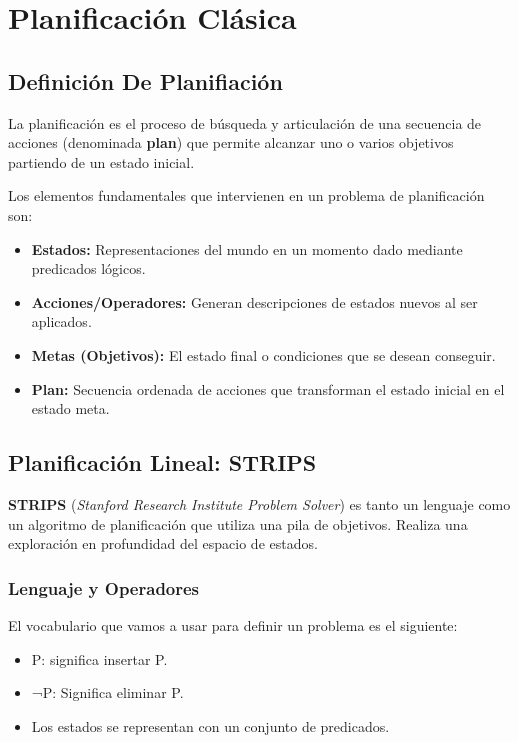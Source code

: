 \chapter{Planificación Clásica}

\section{Definición De Planifiación}
La planificación es el proceso de búsqueda y articulación de una secuencia de acciones (denominada \textbf{plan}) que permite alcanzar uno o varios objetivos partiendo de un estado inicial. 

Los elementos fundamentales que intervienen en un problema de planificación son:
\begin{itemize}
    \item \textbf{Estados:} Representaciones del mundo en un momento dado mediante predicados lógicos.
    \item \textbf{Acciones/Operadores:} Generan descripciones de estados nuevos al ser aplicados.
    \item \textbf{Metas (Objetivos):} El estado final o condiciones que se desean conseguir.
    \item \textbf{Plan:} Secuencia ordenada de acciones que transforman el estado inicial en el estado meta.
\end{itemize}

\section{Planificación Lineal: STRIPS}
\textbf{STRIPS} (\textit{Stanford Research Institute Problem Solver}) es tanto un lenguaje como un algoritmo de planificación que utiliza una pila de objetivos. Realiza una exploración en profundidad del espacio de estados.


\subsection{Lenguaje y Operadores}

El vocabulario que vamos a usar para definir un problema es el siguiente:
\begin{itemize}
    \item P: significa insertar P.
    \item ¬P: Significa eliminar P.
    \item Los estados se representan con un conjunto de predicados.
\end{itemize}

